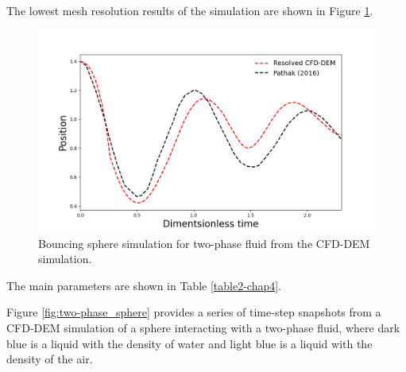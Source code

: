 The lowest mesh resolution results of the simulation are shown in Figure \ref{fig:2ph_exp}.
\begin{figure}[!ht]
    \centering
    \includegraphics[width=15cm]{Images/chap3/bouncing_sphere_plot.png}
    \caption{Bouncing sphere simulation for two-phase fluid from the CFD-DEM simulation.}
    \label{fig:2ph_exp}
    \end{figure}
The main parameters are shown in Table \ref{table2-chap4}. 

Figure \ref{fig:two-phase_sphere} provides a series of time-step snapshots from a CFD-DEM simulation of a sphere interacting with a two-phase fluid, where dark blue is a liquid with the density of water and light blue is a liquid with the density of the air.

